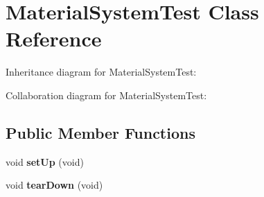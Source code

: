 \hypertarget{class_material_system_test}{\section{Material\+System\+Test Class Reference}
\label{class_material_system_test}
}


Inheritance diagram for Material\+System\+Test\+:


Collaboration diagram for Material\+System\+Test\+:
\subsection*{Public Member Functions}
\begin{DoxyCompactItemize}
\item 
\hypertarget{class_material_system_test_afc554b7e042595056e92cb537f12f91b}{void {\bfseries set\+Up} (void)}\label{class_material_system_test_afc554b7e042595056e92cb537f12f91b}

\item 
\hypertarget{class_material_system_test_a54371bda18650426c2fce1e144740f57}{void {\bfseries tear\+Down} (void)}\label{class_material_system_test_a54371bda18650426c2fce1e144740f57}

\end{DoxyCompactItemize}
